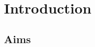 \documentclass[]{final_report}
\theoremstyle{definition}
\begin{document}

\newpage


\chapter{Introduction}


\section{Aims}
\end{document}
